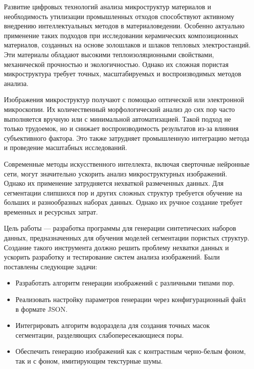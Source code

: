 \documentclass[code]{wordcore}
\begin{document}

\ttableofcontents

\newpage


Развитие цифровых технологий анализа микроструктур материалов и необходимость утилизации промышленных отходов способствуют активному внедрению интеллектуальных методов в материаловедении. Особенно актуально применение таких подходов при исследовании керамических композиционных материалов, созданных на основе золошлаков и шлаков тепловых электростанций. Эти материалы обладают высокими теплоизоляционными свойствами, механической прочностью и экологичностью. Однако их сложная пористая микроструктура требует точных, масштабируемых и воспроизводимых методов анализа.

Изображения микроструктур получают с помощью оптической или электронной микроскопии. Их количественный морфологический анализ до сих пор часто выполняется вручную или с минимальной автоматизацией. Такой подход не только трудоемок, но и снижает воспроизводимость результатов из-за влияния субъективного фактора. Это также затрудняет промышленную интеграцию метода и проведение масштабных исследований.

Современные методы искусственного интеллекта, включая сверточные нейронные сети, могут значительно ускорить анализ микроструктурных изображений. Однако их применение затрудняется нехваткой размеченных данных. Для сегментации слипшихся пор и других сложных структур требуется обучение на больших и разнообразных наборах данных. Однако их ручное создание требует временных и ресурсных затрат.

Цель работы --- разработка программы для генерации синтетических наборов данных, предназначенных для обучения моделей сегментации пористых структур. Создание такого инструмента должно решить проблему нехватки данных и ускорить разработку и тестирование систем анализа изображений. Были поставлены следующие задачи:
\begin{itemize}
	\item Разработать алгоритм генерации изображений с различными типами пор.
	\item Реализовать настройку параметров генерации через конфигурационный файл в формате JSON.
	\item Интегрировать алгоритм водораздела для создания точных масок сегментации, разделяющих слабопересекающиеся поры.
	\item Обеспечить генерацию изображений как с контрастным черно-белым фоном, так и с фоном, имитирующим текстурные шумы.
\end{itemize}
\end{document}
